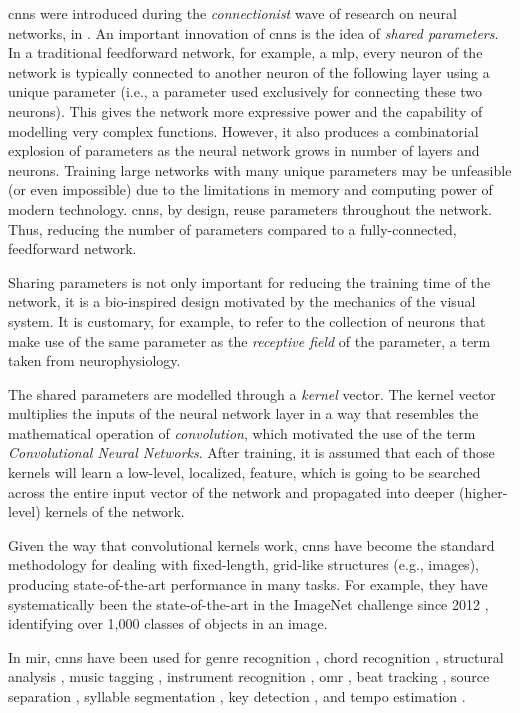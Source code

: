 

\glspl{cnn} were introduced during the \emph{connectionist}
wave of research on neural networks, in
\textcite{lecun1989generalization, lecun1989handwritten}. An
important innovation of \glspl{cnn} is the idea of
\emph{shared parameters}. In a traditional feedforward
network, for example, a \gls{mlp}, every neuron of the
network is typically connected to another neuron of the
following layer using a unique parameter (i.e., a parameter
used exclusively for connecting these two neurons). This
gives the network more expressive power and the capability
of modelling very complex functions. However, it also
produces a combinatorial explosion of parameters as the
neural network grows in number of layers and neurons.
Training large networks with many unique parameters may be
unfeasible (or even impossible) due to the limitations in
memory and computing power of modern technology.
\glspl{cnn}, by design, reuse parameters throughout the
network. Thus, reducing the number of parameters compared to
a fully-connected, feedforward network.

Sharing parameters is not only important for reducing the
training time of the network, it is a bio-inspired design
motivated by the mechanics of the visual system. It is
customary, for example, to refer to the collection of
neurons that make use of the same parameter as the
\emph{receptive field} of the parameter, a term taken from
neurophysiology.

The shared parameters are modelled through a \emph{kernel}
vector. The kernel vector multiplies the inputs of the
neural network layer in a way that resembles the
mathematical operation of \emph{convolution}, which
motivated the use of the term \emph{Convolutional Neural
Networks}. After training, it is assumed that each of those
kernels will learn a low-level, localized, feature, which is
going to be searched across the entire input vector of the
network and propagated into deeper (higher-level) kernels of
the network.

Given the way that convolutional kernels work, \glspl{cnn}
have become the standard methodology for dealing with
fixed-length, grid-like structures (e.g., images), producing
state-of-the-art performance in many tasks. For example,
they have systematically been the state-of-the-art in the
ImageNet challenge since 2012
\parencite{krizhevsky2012imagenet}, identifying over 1,000
classes of objects in an image.

In \gls{mir}, \glspl{cnn} have been used for genre
recognition \parencite{dieleman2011audiobased}, chord
recognition \parencite{humphrey2012rethinking}, structural
analysis \parencite{ullrich2014boundary, grill2015music},
music tagging \parencite{choi2016automatic}, instrument
recognition \parencite{lostanlen2016deep}, \gls{omr}
\parencite{calvozaragoza2017endend, pacha2018optical}, beat
tracking \parencite{gkiokas2017convolutional}, source
separation \parencite{miron2017monaural}, syllable
segmentation \parencite{pons2017scoreinformed}, key
detection \parencite{korzeniowski2018genreagnostic}, and
tempo estimation \parencite{schreiber2018singlestep,
schreiber2019musical}.
